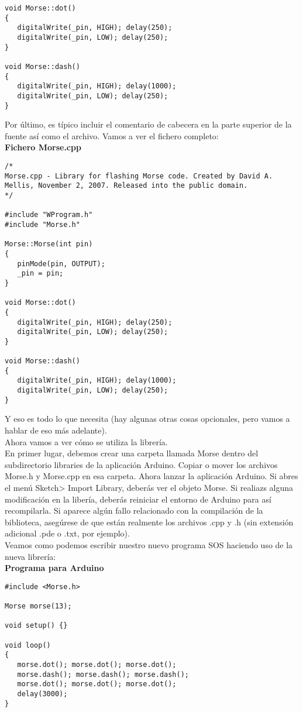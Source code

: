 \begin{lstlisting}
void Morse::dot()
{
   digitalWrite(_pin, HIGH); delay(250);
   digitalWrite(_pin, LOW); delay(250);
}

void Morse::dash()
{
   digitalWrite(_pin, HIGH); delay(1000);
   digitalWrite(_pin, LOW); delay(250);
}
\end{lstlisting}
Por último, es típico incluir el comentario de cabecera en la parte superior de la fuente así como el archivo. Vamos a ver el fichero completo:\\
\textbf{Fichero Morse.cpp}
\begin{lstlisting}
/*
Morse.cpp - Library for flashing Morse code. Created by David A. Mellis, November 2, 2007. Released into the public domain.
*/

#include "WProgram.h"
#include "Morse.h"

Morse::Morse(int pin)
{
   pinMode(pin, OUTPUT);
   _pin = pin;
}

void Morse::dot()
{
   digitalWrite(_pin, HIGH); delay(250);
   digitalWrite(_pin, LOW); delay(250);
}

void Morse::dash()
{
   digitalWrite(_pin, HIGH); delay(1000);
   digitalWrite(_pin, LOW); delay(250);
}
\end{lstlisting}
Y eso es todo lo que necesita (hay algunas otras cosas opcionales, pero vamos a hablar de eso más adelante).\\
Ahora vamos a ver cómo se utiliza la librería.\\
En primer lugar, debemos crear una carpeta llamada Morse dentro del subdirectorio libraries de la aplicación Arduino. Copiar o mover los archivos Morse.h y Morse.cpp en esa carpeta. Ahora lanzar la aplicación Arduino. Si abres el menú Sketch> Import Library, deberás ver el objeto Morse. Si realiazs alguna modificación en la libería, deberás reiniciar el entorno de Arduino para así recompilarla. Si aparece algún fallo relacionado con la compilación de la biblioteca, asegúrese de que están realmente los archivos .cpp y .h (sin extensión adicional .pde o .txt, por ejemplo).\\
Veamos como podemos escribir nuestro nuevo programa SOS haciendo uso de la nueva librería:\\
\textbf{Programa para Arduino}
\begin{lstlisting}
#include <Morse.h>

Morse morse(13);

void setup() {}

void loop()
{
   morse.dot(); morse.dot(); morse.dot();
   morse.dash(); morse.dash(); morse.dash();
   morse.dot(); morse.dot(); morse.dot();
   delay(3000);
}
\end{lstlisting}
